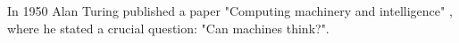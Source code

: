  In 1950 Alan Turing published a paper "Computing machinery and intelligence" \cite{Turing1950}, where he stated a crucial question: "Can machines think?". 
 

